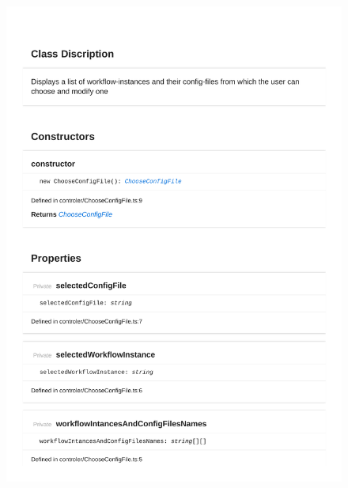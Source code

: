 \begin{figure}[H]
\centerline{\includegraphics[width=\textwidth]{FrontendDocsAsPDF/Model/ChooseConfigFile.pdf}}
\end{figure}

